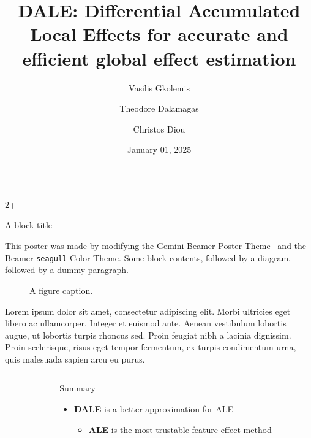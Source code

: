 \documentclass[final]{beamer}
\title{DALE: Differential Accumulated Local Effects for accurate and efficient global effect estimation}
\author{Vasilis Gkolemis \inst{1, 2} \and Theodore Dalamagas \inst{1} \and Christos Diou \inst{2}}
\institute[shortinst]{\inst{1} ATHENA Research Center \samelineand \inst{2} Harokopio University of Athens}
\date{January 01, 2025}
\newlength{\sepwidth}
\newlength{\colwidth}
\newcommand{\separatorcolumn}{\begin{column}{\sepwidth}\end{column}}
\begin{document}
\begin{frame}[t]

  \begin{columns}[t]

  \begin{column}{2\colwidth+\sepwidth}
  \begin{block}{A block title}

    This poster was made by modifying the Gemini Beamer Poster Theme~\parencite{Athalye2018} and the Beamer \texttt{seagull} Color Theme.
    Some block contents, followed by a diagram, followed by a dummy paragraph.

    \begin{figure}
      \centering
      \caption{A figure caption.}
    \end{figure}

    Lorem ipsum dolor sit amet, consectetur adipiscing elit. Morbi ultricies
    eget libero ac ullamcorper. Integer et euismod ante. Aenean vestibulum
    lobortis augue, ut lobortis turpis rhoncus sed. Proin feugiat nibh a
    lacinia dignissim. Proin scelerisque, risus eget tempor fermentum, ex
    turpis condimentum urna, quis malesuada sapien arcu eu purus.

  \end{block}
  \end{column}

  \end{columns}

  \begin{columns}[t]
    \separatorcolumn

    \begin{column}{\colwidth}
        \begin{exampleblock}{Summary}
                \LARGE{
        \begin{itemize}
                    \item \textbf{DALE} is a better approximation for ALE
                    \begin{itemize}
                        \item \textbf{ALE} is the most trustable feature effect method
                    \end{itemize}
        \end{itemize}}


\end{exampleblock}
\end{column}
\end{columns}
\end{frame}
\end{document}
